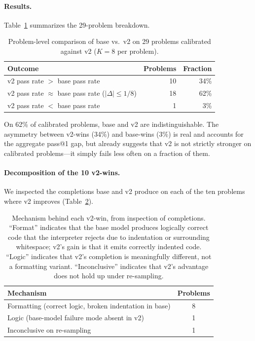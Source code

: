 \documentclass[11pt,a4paper]{article}
\begin{document}
\paragraph{Results.}
Table~\ref{tab:format-capability} summarizes the 29-problem breakdown.

\begin{table}[ht]
\centering
\caption{Problem-level comparison of base vs.\ v2 on 29 problems calibrated against v2 ($K = 8$ per problem).}
\label{tab:format-capability}
\begin{tabular}{lrr}
\toprule
Outcome & Problems & Fraction \\
\midrule
v2 pass rate $>$ base pass rate & 10 & 34\% \\
v2 pass rate $\approx$ base pass rate ($|\Delta| \leq 1/8$) & 18 & 62\% \\
v2 pass rate $<$ base pass rate & 1 & 3\% \\
\bottomrule
\end{tabular}
\end{table}

On 62\% of calibrated problems, base and v2 are indistinguishable.
The asymmetry between v2-wins (34\%) and base-wins (3\%) is real and accounts for the aggregate pass@1 gap, but already suggests that v2 is not strictly stronger on calibrated problems---it simply fails less often on a fraction of them.

\paragraph{Decomposition of the 10 v2-wins.}
We inspected the completions base and v2 produce on each of the ten problems where v2 improves (Table~\ref{tab:format-breakdown}).

\begin{table}[ht]
\centering
\caption{Mechanism behind each v2-win, from inspection of completions. ``Format'' indicates that the base model produces logically correct code that the interpreter rejects due to indentation or surrounding whitespace; v2's gain is that it emits correctly indented code. ``Logic'' indicates that v2's completion is meaningfully different, not a formatting variant. ``Inconclusive'' indicates that v2's advantage does not hold up under re-sampling.}
\label{tab:format-breakdown}
\begin{tabular}{lc}
\toprule
Mechanism & Problems \\
\midrule
Formatting (correct logic, broken indentation in base) & 8 \\
Logic (base-model failure mode absent in v2) & 1 \\
Inconclusive on re-sampling & 1 \\
\bottomrule
\end{tabular}
\end{table}
\end{document}
